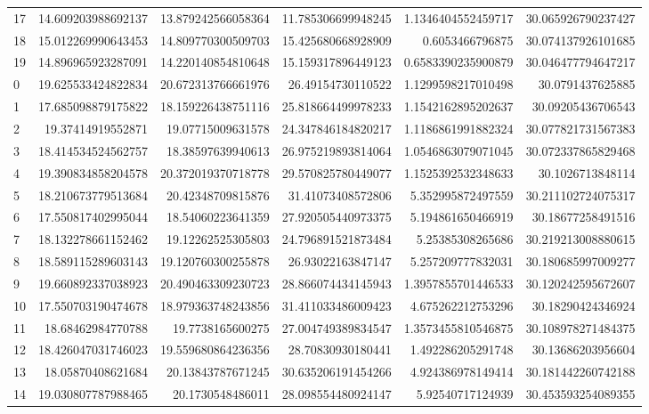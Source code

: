 \begin{tabular}{lrrrrr}
17 & 14.609203988692137 & 13.879242566058364 & 11.785306699948245 & 1.1346404552459717 & 30.065926790237427 \\
18 & 15.012269990643453 & 14.809770300509703 & 15.425680668928909 & 0.6053466796875 & 30.074137926101685 \\
19 & 14.896965923287091 & 14.220140854810648 & 15.159317896449123 & 0.6583390235900879 & 30.046477794647217 \\
0 & 19.625533424822834 & 20.672313766661976 & 26.49154730110522 & 1.1299598217010498 & 30.0791437625885 \\
1 & 17.685098879175822 & 18.159226438751116 & 25.818664499978233 & 1.1542162895202637 & 30.09205436706543 \\
2 & 19.37414919552871 & 19.07715009631578 & 24.347846184820217 & 1.1186861991882324 & 30.077821731567383 \\
3 & 18.414534524562757 & 18.38597639940613 & 26.975219893814064 & 1.0546863079071045 & 30.072337865829468 \\
4 & 19.390834858204578 & 20.372019370718778 & 29.570825780449077 & 1.1525392532348633 & 30.1026713848114 \\
5 & 18.210673779513684 & 20.42348709815876 & 31.41073408572806 & 5.352995872497559 & 30.211102724075317 \\
6 & 17.550817402995044 & 18.54060223641359 & 27.920505440973375 & 5.194861650466919 & 30.18677258491516 \\
7 & 18.132278661152462 & 19.12262525305803 & 24.796891521873484 & 5.25385308265686 & 30.219213008880615 \\
8 & 18.589115289603143 & 19.120760300255878 & 26.93022163847147 & 5.257209777832031 & 30.180685997009277 \\
9 & 19.660892337038923 & 20.490463309230723 & 28.866074434145943 & 1.3957855701446533 & 30.120242595672607 \\
10 & 17.550703190474678 & 18.979363748243856 & 31.411033486009423 & 4.675262212753296 & 30.18290424346924 \\
11 & 18.68462984770788 & 19.7738165600275 & 27.004749389834547 & 1.3573455810546875 & 30.108978271484375 \\
12 & 18.426047031746023 & 19.559680864236356 & 28.70830930180441 & 1.492286205291748 & 30.13686203956604 \\
13 & 18.05870408621684 & 20.13843787671245 & 30.635206191454266 & 4.924386978149414 & 30.181442260742188 \\
14 & 19.030807787988465 & 20.1730548486011 & 28.098554480924147 & 5.92540717124939 & 30.453593254089355 \\

\end{tabular}
